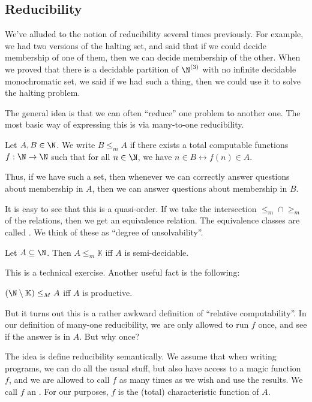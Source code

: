 \documentclass[a4paper]{article}
\newcommand\K{\mathbb{K}}
\begin{document}

\subsection{Reducibility}
We've alluded to the notion of reducibility several times previously. For example, we had two versions of the halting set, and said that if we could decide membership of one of them, then we can decide membership of the other. When we proved that there is a decidable partition of $\N^{(3)}$ with no infinite decidable monochromatic set, we said if we had such a thing, then we could use it to solve the halting problem.

The general idea is that we can often ``reduce'' one problem to another one. The most basic way of expressing this is via many-to-one reducibility.

\begin{defi}
  Let $A, B \in \N$. We write $B \leq_m A$ if there exists a total computable functions $f: \N \to \N$ such that for all $n \in \N$, we have $n \in B \leftrightarrow f(n) \in A$.
\end{defi}
Thus, if we have such a set, then whenever we can correctly answer questions about membership in $A$, then we can answer questions about membership in $B$.

It is easy to see that this is a quasi-order. If we take the intersection $\leq_m \cap \geq_m$ of the relations, then we get an equivalence relation. The equivalence classes are called . We think of these as ``degree of unsolvability''.

\begin{prop}
  Let $A \subseteq \N$. Then $A \leq_m \K$ iff $A$ is semi-decidable.
\end{prop}
This is a technical exercise. Another useful fact is the following:
\begin{prop}
  $(\N \setminus \K) \leq_M A$ iff $A$ is productive.
\end{prop}
But it turns out this is a rather awkward definition of ``relative computability''. In our definition of many-one reducibility, we are only allowed to run $f$ once, and see if the answer is in $A$. But why once?

The idea is define reducibility semantically. We assume that when writing programs, we can do all the usual stuff, but also have access to a magic function $f$, and we are allowed to call $f$ as many times as we wish and use the results. We call $f$ an . For our purposes, $f$ is the (total) characteristic function of $A$.
\end{document}
